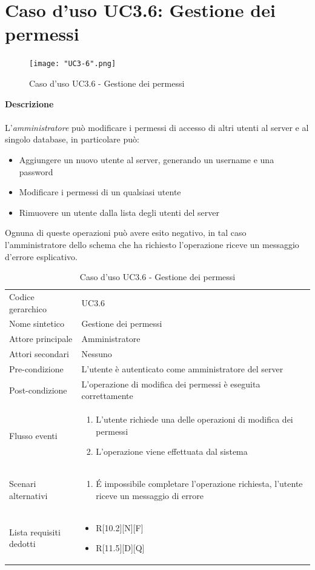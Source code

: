 \documentclass[a4paper]{report}
\begin{document}
	 \section{Caso d'uso UC3.6: Gestione dei permessi}
	 	\begin{figure}[H]
			\centering
			\texttt{[image: "UC3-6".png]}
			\caption{Caso d'uso UC3.6 - Gestione dei permessi}
		\end{figure}
	 \textbf{Descrizione} \\ \\
	 L'\emph{amministratore} può modificare i permessi di accesso di altri utenti al server e al singolo
	  database, in particolare può:
	 \begin{itemize}
	 	\item Aggiungere un nuovo utente al server, generando un username e una password
	 	\item Modificare i permessi di un qualsiasi utente
	 	\item Rimuovere un utente dalla lista degli utenti del server
	 \end{itemize}
	 Ognuna di queste operazioni può avere esito negativo, in tal caso l'amministratore dello schema che ha
	 richiesto l'operazione riceve un messaggio d'errore esplicativo.
		\begin{table}[H]
		\begin{tabularx}{\textwidth}{X | X}\toprule
			\rowcolor{orange!65}Codice gerarchico & UC3.6 \\
			Nome sintetico & Gestione dei permessi \\
			\rowcolor{orange!65}Attore principale & Amministratore\\
			Attori secondari & Nessuno \\
			\rowcolor{orange!65}Pre-condizione & L'utente è autenticato come amministratore del server\\
			Post-condizione & L'operazione di modifica dei permessi è eseguita correttamente \\
			\rowcolor{orange!65}Flusso eventi & \begin{enumerate}
			\item L'utente richiede una delle operazioni di modifica dei permessi
			\item L'operazione viene effettuata dal sistema
			\end{enumerate} \\
			Scenari alternativi & \begin{enumerate}
			\item \'E impossibile completare l'operazione richiesta, l'utente riceve un messaggio di errore
			\end{enumerate} \\
			\rowcolor{orange!65}Lista requisiti dedotti & \begin{itemize}
				\item R[10.2][N][F]
				\item R[11.5][D][Q]
				\end{itemize} \\
			\bottomrule
		\end{tabularx}
		\caption{Caso d'uso UC3.6 - Gestione dei permessi}
	 \end{table}
\end{document}
